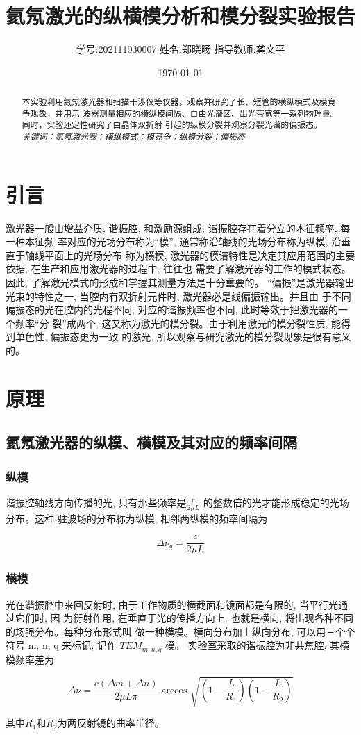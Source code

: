 \documentclass[12pt,a4paper]{article}
\title{\vspace{-4cm}\Large 氦氖激光的纵横模分析和模分裂实验报告}  %
\author{\kaishu 学号:202111030007 \hspace{2cm} 姓名:郑晓旸 \hspace{2cm} 指导教师:龚文平}   %
\date{\today}
\newcommand{\be}[1]{
    \begin{equation}
        #1
    \end{equation}
}
\begin{document}
\maketitle

\begin{abstract}
    本实验利用氦氖激光器和扫描干涉仪等仪器，观察并研究了长、短管的横纵模式及模竞争现象，并用示
波器测量相应的横纵模间隔、自由光谱区、出光带宽等一系列物理量。同时，实验还定性研究了由晶体双折射
引起的纵模分裂并观察分裂光谱的偏振态。\\
    \textsl{关键词：氦氖激光器；横纵模式；模竞争；纵模分裂；偏振态}
\end{abstract}

\section{引言}
激光器一般由增益介质, 谐振腔, 和激励源组成, 谐振腔存在着分立的本征频率, 每一种本征频
率对应的光场分布称为“模”, 通常称沿轴线的光场分布称为纵模, 沿垂直于轴线平面上的光场分布
称为横模, 激光器的模谱特性是决定其应用范围的主要依据, 在生产和应用激光器的过程中, 往往也
需要了解激光器的工作的模式状态。因此, 了解激光模式的形成和掌握其测量方法是十分重要的。
“偏振”是激光器输出光束的特性之一, 当腔内有双折射元件时, 激光器必是线偏振输出。并且由
于不同偏振态的光在腔内的光程不同, 对应的谐振频率也不同, 此时等效于把激光器的一个频率“分
裂”成两个, 这又称为激光的模分裂。由于利用激光的模分裂性质, 能得到单色性, 偏振态更为一致
的激光, 所以观察与研究激光的模分裂现象是很有意义的。 \cite{textbook}

\section{原理}
\subsection{氦氖激光器的纵模、横模及其对应的频率间隔}
\subsubsection{纵模}
谐振腔轴线方向传播的光, 只有那些频率是$\frac{c}{2\mu L}$
的整数倍的光才能形成稳定的光场分布。这种
驻波场的分布称为纵模, 相邻两纵模的频率间隔为
\be{\Delta \nu_q=\frac{c}{2\mu L}}
\subsubsection{横模}
光在谐振腔中来回反射时, 由于工作物质的横截面和镜面都是有限的, 当平行光通过它们时, 因
为衍射作用, 在垂直于光的传播方向上, 也就是横向, 将出现各种不同的场强分布。每种分布形式叫
做一种横模。横向分布加上纵向分布, 可以用三个个符号 m, n, q 来标记, 记作 $TEM_{m,n,q}$ 模。
实验室采取的谐振腔为非共焦腔, 其横模频率差为
\be{\Delta \nu=\frac{c(\Delta m+\Delta n)}{2\mu L \pi}\arccos{\sqrt{(1-\frac{L}{R_1})(1-\frac{L}{R_2})}}}
其中$R_1$和$R_2$为两反射镜的曲率半径。\cite{siegman1986lasers,saleh1991fundamentals}
\end{document}
